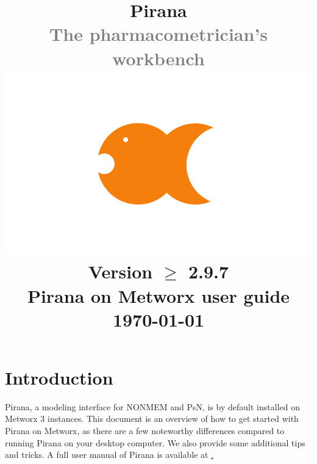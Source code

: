 \documentclass[a4,11pt]{report}
\begin{document}
\title{
  \vspace{-100pt}
  \textbf{
    \textcolor{PiranaOrange}{\Large Pirana}
  }\\
  \vspace{5pt}
  \scriptsize \textcolor{Grey}{The pharmacometrician's workbench} \\
  \normalsize
  \vspace{15pt}
  \hspace{15pt}\includegraphics[scale=0.2]{../images/pirana_logo.jpg}\\
  \vspace{15pt}
  \scriptsize Version $\geq$ 2.9.7\\Pirana on Metworx user guide \\
  \vspace{5pt}
  \scriptsize {\today} \\
  \date{}
}
\maketitle

\section*{Introduction}\label{introduction}

Pirana, a modeling interface for NONMEM and PsN, is by default installed
on Metworx 3 instances. This document is an overview of how to get started with Pirana on Metworx, as
there are a few noteworthy differences compared to running Pirana on
your desktop computer. We also provide some additional tips and tricks.
A full user manual of Pirana is available at
\href{www.pirana-software.com}.

\vspace{10pt}
\end{document}
